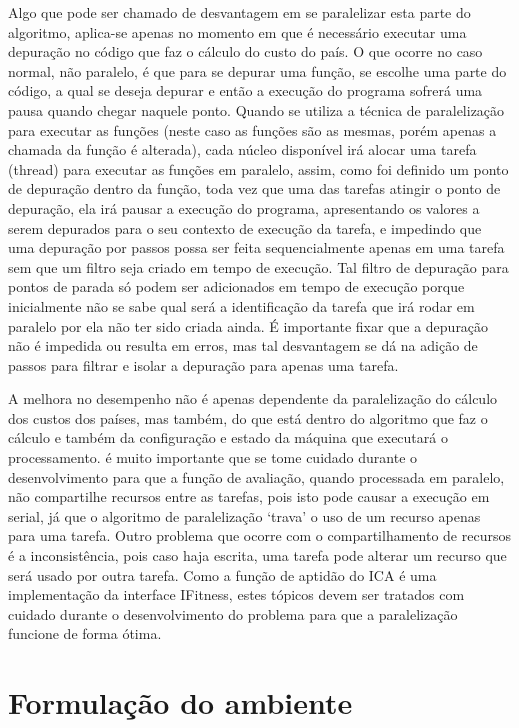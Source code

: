 Algo que pode ser chamado de desvantagem em se paralelizar esta parte do algoritmo, aplica-se apenas no momento em que é necessário executar uma depuração no código que faz o cálculo do custo do país. O que ocorre no caso normal, não paralelo, é que para se depurar uma função, se escolhe uma parte do código, a qual se deseja depurar e então a execução do programa sofrerá uma pausa quando chegar naquele ponto. Quando se utiliza a técnica de paralelização para executar as funções (neste caso as funções são as mesmas, porém apenas a chamada da função é alterada), cada núcleo disponível irá alocar uma tarefa (thread) para executar as funções em paralelo, assim, como foi definido um ponto de depuração dentro da função, toda vez que uma das tarefas atingir o ponto de depuração, ela irá pausar a execução do programa, apresentando os valores a serem depurados para o seu contexto de execução da tarefa, e impedindo que uma depuração por passos possa ser feita sequencialmente apenas em uma tarefa sem que um filtro seja criado em tempo de execução. Tal filtro de depuração para pontos de parada só podem ser adicionados em tempo de execução porque inicialmente não se sabe qual será a identificação da tarefa que irá rodar em paralelo por ela não ter sido criada ainda. É importante fixar que a depuração não é impedida ou resulta em erros, mas tal desvantagem se dá na adição de passos para filtrar e isolar a depuração para apenas uma tarefa.


A melhora no desempenho não é apenas dependente da paralelização do cálculo dos custos dos países, mas também, do que está dentro do algoritmo que faz o cálculo e também da configuração e estado da máquina que executará o processamento. é muito importante que se tome cuidado durante o desenvolvimento para que a função de avaliação, quando processada em paralelo, não compartilhe recursos entre as tarefas, pois isto pode causar a execução em serial, já que o algoritmo de paralelização ‘trava’ o uso de um recurso apenas para uma tarefa. Outro problema que ocorre com o compartilhamento de recursos é a inconsistência, pois caso haja escrita, uma tarefa pode alterar um recurso que será usado por outra tarefa. Como a função de aptidão do ICA é uma implementação da interface IFitness, estes tópicos devem ser tratados com cuidado durante o desenvolvimento do problema para que a paralelização funcione de forma ótima.




\section{Formulação do ambiente}
\label{Formulação do ambiente}


